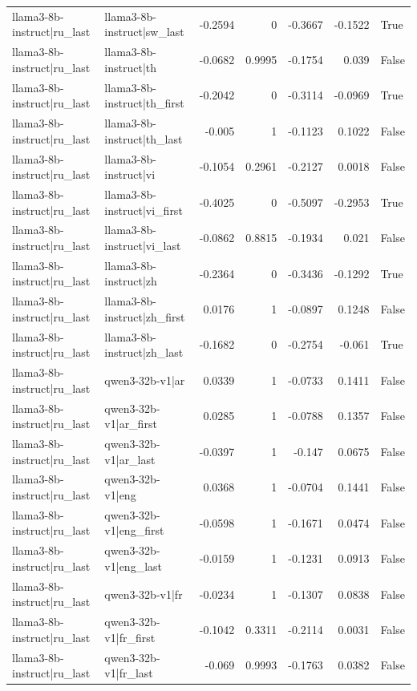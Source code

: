 \begin{table}
\begin{tabular}{l l r r r r l}
llama3-8b-instruct|ru_last & llama3-8b-instruct|sw_last & -0.2594 & 0 & -0.3667 & -0.1522 & True \\
llama3-8b-instruct|ru_last & llama3-8b-instruct|th & -0.0682 & 0.9995 & -0.1754 & 0.039 & False \\
llama3-8b-instruct|ru_last & llama3-8b-instruct|th_first & -0.2042 & 0 & -0.3114 & -0.0969 & True \\
llama3-8b-instruct|ru_last & llama3-8b-instruct|th_last & -0.005 & 1 & -0.1123 & 0.1022 & False \\
llama3-8b-instruct|ru_last & llama3-8b-instruct|vi & -0.1054 & 0.2961 & -0.2127 & 0.0018 & False \\
llama3-8b-instruct|ru_last & llama3-8b-instruct|vi_first & -0.4025 & 0 & -0.5097 & -0.2953 & True \\
llama3-8b-instruct|ru_last & llama3-8b-instruct|vi_last & -0.0862 & 0.8815 & -0.1934 & 0.021 & False \\
llama3-8b-instruct|ru_last & llama3-8b-instruct|zh & -0.2364 & 0 & -0.3436 & -0.1292 & True \\
llama3-8b-instruct|ru_last & llama3-8b-instruct|zh_first & 0.0176 & 1 & -0.0897 & 0.1248 & False \\
llama3-8b-instruct|ru_last & llama3-8b-instruct|zh_last & -0.1682 & 0 & -0.2754 & -0.061 & True \\
llama3-8b-instruct|ru_last & qwen3-32b-v1|ar & 0.0339 & 1 & -0.0733 & 0.1411 & False \\
llama3-8b-instruct|ru_last & qwen3-32b-v1|ar_first & 0.0285 & 1 & -0.0788 & 0.1357 & False \\
llama3-8b-instruct|ru_last & qwen3-32b-v1|ar_last & -0.0397 & 1 & -0.147 & 0.0675 & False \\
llama3-8b-instruct|ru_last & qwen3-32b-v1|eng & 0.0368 & 1 & -0.0704 & 0.1441 & False \\
llama3-8b-instruct|ru_last & qwen3-32b-v1|eng_first & -0.0598 & 1 & -0.1671 & 0.0474 & False \\
llama3-8b-instruct|ru_last & qwen3-32b-v1|eng_last & -0.0159 & 1 & -0.1231 & 0.0913 & False \\
llama3-8b-instruct|ru_last & qwen3-32b-v1|fr & -0.0234 & 1 & -0.1307 & 0.0838 & False \\
llama3-8b-instruct|ru_last & qwen3-32b-v1|fr_first & -0.1042 & 0.3311 & -0.2114 & 0.0031 & False \\
llama3-8b-instruct|ru_last & qwen3-32b-v1|fr_last & -0.069 & 0.9993 & -0.1763 & 0.0382 & False \\

\end{tabular}
\end{table}
